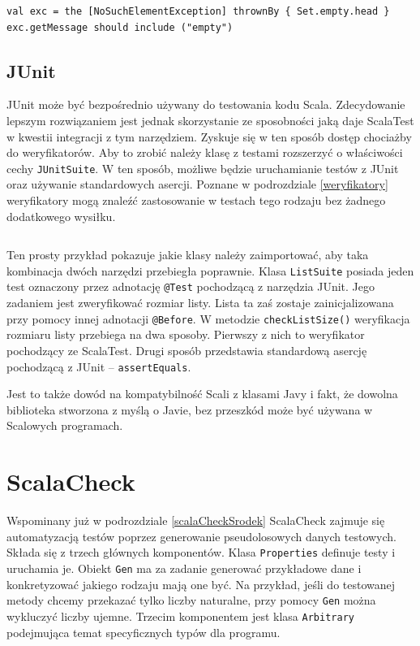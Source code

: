 \documentclass[brudnopis]{xmgr}
\begin{document}
\begin{verbatim}
val exc = the [NoSuchElementException] thrownBy { Set.empty.head }
exc.getMessage should include ("empty")
\end{verbatim}

\subsection{JUnit}

JUnit może być bezpośrednio używany do testowania kodu Scala. Zdecydowanie lepszym rozwiązaniem jest jednak skorzystanie ze sposobności jaką daje ScalaTest w kwestii integracji z tym narzędziem. Zyskuje się w ten sposób dostęp chociażby do weryfikatorów. Aby to zrobić należy klasę z testami rozszerzyć o właściwości cechy \texttt{JUnitSuite}. W ten sposób, możliwe będzie uruchamianie testów z JUnit oraz używanie standardowych asercji. Poznane w podrozdziale \ref{weryfikatory} weryfikatory mogą znaleźć zastosowanie w testach tego rodzaju bez żadnego dodatkowego wysiłku. 

\inputminted[fontsize=\small]{scala}{code/ListSuite.scala}

Ten prosty przykład pokazuje jakie klasy należy zaimportować, aby taka kombinacja dwóch narzędzi przebiegła poprawnie. Klasa \texttt{ListSuite} posiada jeden test oznaczony przez adnotację \texttt{@Test} pochodzącą z narzędzia JUnit. Jego zadaniem jest zweryfikować rozmiar listy. Lista ta zaś zostaje zainicjalizowana przy pomocy innej adnotacji \texttt{@Before}. W metodzie \texttt{checkListSize()} weryfikacja rozmiaru listy przebiega na dwa sposoby. Pierwszy z nich to weryfikator pochodzący ze ScalaTest. Drugi sposób przedstawia standardową asercję pochodzącą z JUnit -- \texttt{assertEquals}.

Jest to także dowód na kompatybilność Scali z klasami Javy i fakt, że dowolna biblioteka stworzona z myślą o Javie, bez przeszkód może być używana w Scalowych programach.

\section{ScalaCheck}

Wspominany już w podrozdziale \ref{scalaCheckSrodek} ScalaCheck zajmuje się automatyzacją testów poprzez generowanie pseudolosowych danych testowych. Składa się z trzech głównych komponentów.
Klasa \texttt{Properties} definuje testy i uruchamia je. Obiekt \texttt{Gen} ma za zadanie generować przykładowe dane i konkretyzować jakiego rodzaju mają one być. Na przykład, jeśli do testowanej metody chcemy przekazać tylko liczby naturalne, przy pomocy \texttt{Gen} można wykluczyć liczby ujemne. Trzecim komponentem jest klasa \texttt{Arbitrary} podejmująca temat specyficznych typów dla programu.
\end{document}
